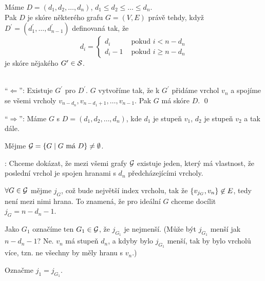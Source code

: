  Máme $D = (d_1, d_2, \dots, d_n)$, $d_1 \leq d_2 \leq \dots \leq d_n$. \\
Pak $D$ je skóre některého grafu $G = (V,E)$ právě tehdy, když $D^\prime = (d_1^\prime, \dots, d_{n-1}^\prime)$ 
definovaná tak, že
\[
    d_i = 
    \begin{cases}
        d_i &\text{ pokud } i < n-d_n \\
        d_i-1  &\text{ pokud } i \geq n-d_n
    \end{cases}
\]
je skóre nějakého $G^\prime \in \S$.

\\
\enquote{$\Leftarrow$}: Existuje $G^\prime$ pro $D^\prime$. $G$ vytvoříme tak, že k $G^\prime$ přidáme vrchol $v_n$ a 
spojíme se všemi vrcholy $v_{n-d_n}, v_{n-d_1+1}, \dots, v_{n-1}$. Pak $G$ má skóre $D$. \qed
\vspace{1em}

\enquote{$\Rightarrow$}: Máme $G$ s $D = (d_1, d_2, \dots, d_n)$, kde $d_1$ je stupeň $v_1$, $d_2$ je stupeň $v_2$ a tak 
dále.

Mějme $\G = \bc{G \mid G \text{ má } D} \not= \emptyset$.

: Chceme dokázat, že mezi všemi grafy $\G$ existuje jeden, který má vlastnost, že poslední vrchol je spojen 
hranami s $d_n$ předcházejícími vrcholy.

$\forall G \in \G$ mějme $j_G$, což bude největší index vrcholu, tak že $\bc{v_{j_G}, v_n} \not\in E$, tedy není mezi 
nimi hrana. To znamená, že pro ideální $G$ chceme docílit $j_G = n-d_n-1$.

Jako $G_1$ označíme ten $G_1 \in \G$, že $j_{G_1}$ je nejmenší. (Může být $j_{G_1}$ menší jak $n-d_n-1$? Ne. $v_n$ má 
stupeň $d_n$, a kdyby bylo $j_{G_1}$ menší, tak by bylo vrcholů více, tzn. ne všechny by měly hranu s $v_n$.)

Označme $j_1 = j_{G_1}$.

